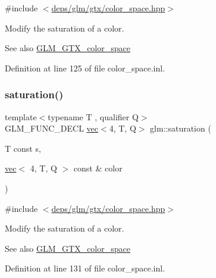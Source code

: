 {\ttfamily \#include $<$\hyperlink{gtx_2color__space_8hpp}{deps/glm/gtx/color\+\_\+space.\+hpp}$>$}

Modify the saturation of a color. \begin{DoxySeeAlso}{See also}
\hyperlink{group__gtx__color__space}{G\+L\+M\+\_\+\+G\+T\+X\+\_\+color\+\_\+space} 
\end{DoxySeeAlso}


Definition at line 125 of file color\+\_\+space.\+inl.

\mbox{\label{group__gtx__color__space_gaba0eacee0736dae860e9371cc1ae4785}} 
\subsubsection{\texorpdfstring{saturation()}{saturation()}\hspace{0.1cm}{\footnotesize\ttfamily [3/3]}}
{\footnotesize\ttfamily template$<$typename T , qualifier Q$>$ \\
G\+L\+M\+\_\+\+F\+U\+N\+C\+\_\+\+D\+E\+CL \hyperlink{structglm_1_1vec}{vec}$<$4, T, Q$>$ glm\+::saturation (\begin{DoxyParamCaption}\item[{T const}]{s,  }\item[{\hyperlink{structglm_1_1vec}{vec}$<$ 4, T, Q $>$ const \&}]{color }\end{DoxyParamCaption})}



{\ttfamily \#include $<$\hyperlink{gtx_2color__space_8hpp}{deps/glm/gtx/color\+\_\+space.\+hpp}$>$}

Modify the saturation of a color. \begin{DoxySeeAlso}{See also}
\hyperlink{group__gtx__color__space}{G\+L\+M\+\_\+\+G\+T\+X\+\_\+color\+\_\+space} 
\end{DoxySeeAlso}


Definition at line 131 of file color\+\_\+space.\+inl.

